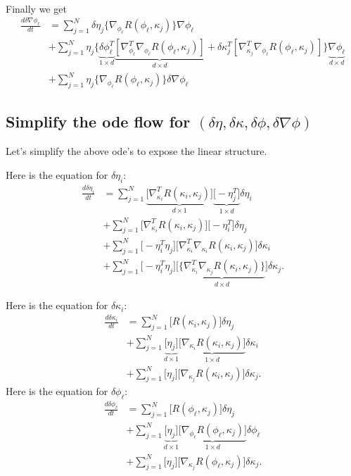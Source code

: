 \documentclass[noinfoline]{imsart}
\begin{document}
{\begin{align}
\end{align}
Finally we get
\begin{align}
\frac{d\delta\nabla\phi_\ell}{dt} 
&= \sum_{j=1}^N  \delta\eta_j  \{ \nabla_{\phi_\ell}R(\phi_\ell,\kappa_j)\} \nabla{\phi}_\ell   \\
&+ \sum_{j=1}^N \eta_j \bigl\{ \underbrace{\delta\phi^T_\ell}_{1\times d} \underbrace{[\nabla_{\phi_\ell}^T\nabla_{\phi_\ell}R(\phi_\ell,\kappa_j)]}_{d\times d} +   \delta\kappa_j^T [\nabla_{\kappa_j}^T\nabla_{\phi_\ell}R(\phi_\ell,\kappa_j)]     \bigr\} \underbrace{\nabla {\phi_\ell}}_{d\times d}  \\
&+ \sum_{j=1}^N \eta_j \{ \nabla_{\phi_\ell}R(\phi_\ell,\kappa_j)\} \delta\nabla {\phi}_\ell
\end{align}

\subsection{Simplify the ode flow for $(\delta \eta,\delta \kappa, \delta \phi, \delta \nabla \phi)$}
\label{simplifiedODE}
Let's simplify the above ode's to expose the linear structure.

Here is the equation for $\delta \eta_i$:
\begin{align*}
\frac{d\delta \eta_i}{dt} &= \sum_{j=1}^N \underbrace{ \bigl[ \nabla^T_{\kappa_i}R(\kappa_i,\kappa_j)\bigr]}_{d\times 1} \underbrace{\bigl[-  \eta_j^T   \bigr]}_{1\times d}\delta\eta_i  \\
&+ \sum_{j=1}^N  \bigl[\nabla^T_{\kappa_i}R(\kappa_i,\kappa_j)\bigr] \bigl[- \eta^T_i     \bigr]\delta\eta_j\\
&+\sum_{j=1}^N \bigl[-\eta^T_i \eta_j\bigr]  \bigl[  \nabla^T_{\kappa_i}\nabla_{\kappa_i}R(\kappa_i,\kappa_j)  \bigr]\delta\kappa_i \\
&+\sum_{j=1}^N {\bigl[-\eta^T_i \eta_j\bigr]}  \bigl[   \underbrace{ \{\nabla^T_{\kappa_i}\nabla_{\kappa_j}R(\kappa_i,\kappa_j)\} }_{d\times d}\bigr]\delta\kappa_j .
\end{align*}


Here is the equation for $\delta \kappa_i$:
\begin{align*}
\frac{d\delta\kappa_i}{dt}&=\sum_{j=1}^N  \bigl[R(\kappa_i,\kappa_j)\bigr] \delta\eta_j  \\
&+\sum_{j=1}^N \underbrace{\bigl[\eta_j\bigr]}_{d\times 1} \underbrace{\bigl[ \nabla_{\kappa_i} R(\kappa_i,\kappa_j)\bigr]}_{1\times d} \delta\kappa_i \\
&+\sum_{j=1}^N \bigl[\eta_j\bigr] \bigl[ \nabla_{\kappa_j} R(\kappa_i,\kappa_j) \bigr] \delta\kappa_j.
\end{align*}
Here is the equation for $\delta \phi_\ell$:
\begin{align}
\frac{d\delta\phi_\ell}{dt} &= \sum_{j=1}^N \bigl[R(\phi_\ell,\kappa_j)\bigr] \delta\eta_j  \\
&+ \sum_{j=1}^N \underbrace{\bigl[\eta_j\bigr]}_{d\times 1} \underbrace{\bigl[ \nabla_{\phi_\ell}R(\phi_\ell,\kappa_j)\bigr]}_{1\times d}  \delta\phi_\ell \\
& + \sum_{j=1}^N \bigl[\eta_j\bigr]\bigl[   \nabla_{\kappa_j}R(\phi_\ell,\kappa_j) \bigr] \delta\kappa_j .
\end{align}

}
\end{document}
